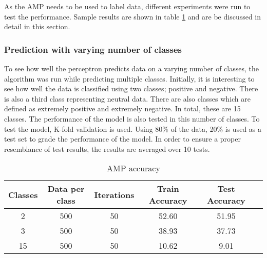 
\begin{comment}
Experiments / Empirical evaluation (roughly 2-3 pages)
• Any details about experiments (dataset sizes, parameter selection, etc)
• Results
• Analysis (discussion of results / visualization / findings / etc)
\end{comment}

As the AMP needs to be used to label data, different experiments were run to test the performance. Sample results are shown in table \ref{table:AMPaccuracy} and are be discussed in detail in this section.

\subsubsection{Prediction with varying number of classes}
To see how well the perceptron predicts data on a varying number of classes, the algorithm was run while predicting multiple classes. Initially, it is interesting to see how well the data is classified using two classes; positive and negative. There is also a third class representing neutral data. There are also classes which are defined as extremely positive and extremely negative. In total, these are 15 classes. The performance of the model is also tested in this number of classes. To test the model, K-fold validation is used. Using 80\% of the data, 20\% is used as a test set to grade the performance of the model. In order to ensure a proper resemblance of test results, the results are averaged over 10 tests.

\begin{table}[h!]
\begin{center}
\begin{tabular}{| c | c | c | c | c | c |}
\hline
 {\textbf{Classes}} 	 
 & {\textbf{Data per class}} 					& {\textbf{Iterations}} 
 & {\textbf{Train Accuracy}} 					& {\textbf{Test Accuracy}} 
 \\
\hline
2	&	500	&	50	&	52.60	& 	51.95	\\
3	&	500	&	50	&	38.93	&	37.73	\\
15	&	500	&	50	&	10.62	&	9.01		\\
\hline
\end{tabular}
\caption{AMP accuracy}
\label{table:AMPaccuracy}
\end{center}
\end{table}


